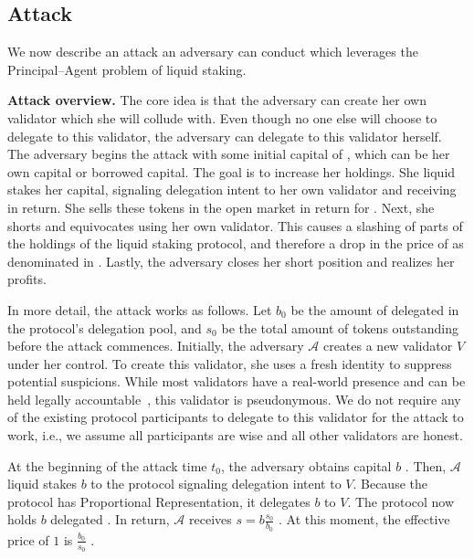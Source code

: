 \subsection{Attack}

We now describe an attack an adversary can conduct which leverages the
Principal--Agent problem of liquid staking.

\noindent
\textbf{Attack overview.}
The core idea is that the adversary can create her own validator
which she will collude with.
Even though no one else will choose to delegate to
this validator, the adversary can delegate to this validator herself.
The adversary begins the attack with some initial capital of \asset, which
can be her own capital or borrowed capital. The goal is to increase her
\asset holdings. She liquid stakes her capital, signaling delegation
intent to her own validator and receiving \stasset in return.
She sells these tokens in the open market in return for \asset.
Next, she shorts \stasset and equivocates using her own validator.
This causes a slashing of parts of the \asset holdings of the liquid
staking protocol, and therefore a drop in the price of \stasset
as denominated in \asset. Lastly, the adversary closes her short
position and realizes her profits.


In more detail, the attack works as follows.
Let $b_0$ be the amount of delegated \asset in the protocol's delegation pool,
and $s_0$ be the total amount of \stasset tokens outstanding
before the attack commences.
Initially,
the adversary $\mathcal{A}$ creates a new validator $V$
under her control. To create this validator, she uses a fresh identity
to suppress potential suspicions. While most validators
have a real-world presence and can be held legally
accountable~\cite{liquid-staking-report}, this validator is pseudonymous.
We do not require any of the existing protocol participants to delegate
to this validator for the attack to work, i.e., we assume all participants
are wise and all other validators are honest.

At the beginning of the attack time $t_0$, the adversary obtains capital
$b$ \asset. Then, $\mathcal{A}$
liquid stakes $b$ \asset to the protocol
signaling delegation intent to $V$. Because the
protocol has Proportional Representation, it delegates $b$ \asset to $V$.
The protocol now holds $b$ delegated \asset.
In return, $\mathcal{A}$ receives $s = b \frac{s_0}{b_0}$ \stasset.
At this moment, the effective price of $1$ \stasset is
$\frac{b_0}{s_0}$ \asset.

